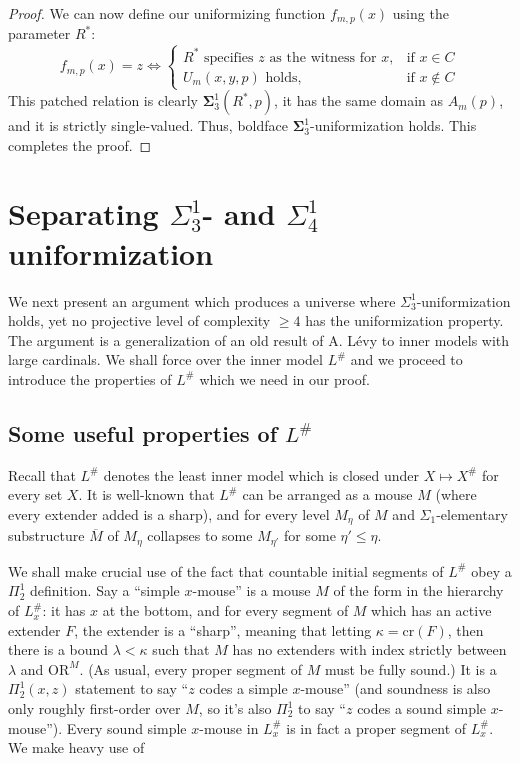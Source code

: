 \documentclass{article}
\theoremstyle{plain}
\theoremstyle{definition}
\newcommand{\Lsharp}{L^{\#}}
\begin{document}
\begin{proof}
We can now define our uniformizing function $f_{m,p}(x)$ using the parameter $R^*$:
\[
f_{m,p}(x) = z \iff 
\begin{cases} 
R^* \text{ specifies } z \text{ as the witness for } x, & \text{if } x \in C \\
U_m(x,y,p) \text{ holds}, & \text{if } x \notin C 
\end{cases}
\]
This patched relation is clearly $\mathbf{\Sigma}^1_3(R^*, p)$, it has the same domain as $A_m(p)$, and it is strictly single-valued. Thus, boldface $\mathbf{\Sigma}^1_3$-uniformization holds. This completes the proof.
\end{proof}

\section{Separating $\Sigma^1_3$- and $\Sigma^1_4$ uniformization}

We next present an argument which produces a universe where $\Sigma^1_3$-uniformization holds, yet no projective level of complexity $\ge 4$ has the uniformization property. The argument is a generalization of an old result of A. L\'evy to inner models with large cardinals. We shall force over the inner model $\Lsharp$ and we proceed to introduce the properties of $\Lsharp$ which we need in our proof.

\subsection{Some useful properties of $\Lsharp$}

Recall that $\Lsharp$ denotes the least inner model which is closed under $X \mapsto X^{\#}$ for every set $X$. It is well-known that $ L^{\#}$ can be arranged as a mouse $M$ (where every extender added is a sharp), and for every level $M_\eta$ of $M$ and $\Sigma_1$-elementary substructure $\overline{M}$ of $M_\eta$ collapses to some $M_{\eta'}$ for some $\eta' \le \eta$.

We shall make crucial use of the fact that countable initial segments of $\Lsharp$ obey a $\Pi^1_2$ definition. Say a ``simple $x$-mouse'' is a mouse $M$ of the form in the hierarchy of $\Lsharp_x$: it has $x$ at the bottom, and for every segment of $M$ which has an active extender $F$, the extender is a ``sharp'', meaning that letting $\kappa = \text{cr}(F)$, then there is a bound $\lambda < \kappa$ such that $M$ has no extenders with index strictly between $\lambda$ and $\text{OR}^M$. (As usual, every proper segment of $M$ must be fully sound.) It is a $\Pi^1_2(x, z)$ statement to say ``$z$ codes a simple $x$-mouse'' (and soundness is also only roughly first-order over $M$, so it's also $\Pi^1_2$ to say ``$z$ codes a sound simple $x$-mouse''). Every sound simple $x$-mouse in $\Lsharp_x$ is in fact a proper segment of $\Lsharp_x$. We make heavy use of 
\end{document}
